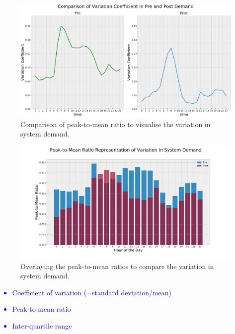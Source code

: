 \documentclass[energies,article,submit,moreauthors,pdftex]{Definitions/mdpi}
\begin{document}
\begin{figure}[H]
\centering
\hspace{-25pt}\includegraphics[width=15 cm]{Graphics/VarCoeff_comp.pdf}
\caption{Comparison of peak-to-mean ratio to visualise the variation in system demand.}\label{fig: PtM_Ratio_Demand_comp}
\end{figure}  

\begin{figure}[H]
\centering
\hspace{-25pt}\includegraphics[width=7 cm]{Graphics/PtM_ratio_Demand.pdf}
\caption{Overlaying the peak-to-mean ratios to compare the variation in system demand.}\label{fig: PtM_Ratio_Demand}
\end{figure}



\textcolor{blue}{
\begin{itemize}
    \item Coefficient of variation (=standard deviation/mean)
    \item Peak-to-mean ratio
    \item Inter-quartile range
\end{itemize}}
\end{document}
